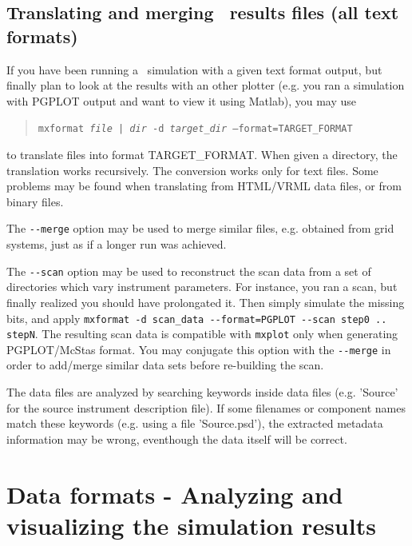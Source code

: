\subsection{Translating and merging \MCX\ results files (all text formats)}
\label{s:mxformat}
    

If you have been running a \MCX\ simulation with a given text format output, but finally plan to look at the results with an other plotter (e.g. you ran a simulation with PGPLOT output and want to view it using Matlab), you may use
\begin{quote}
  \texttt{mxformat \textit{file | dir} -d \textit{target\_dir} --format=TARGET\_FORMAT}
\end{quote}
to translate files into format TARGET\_FORMAT. When given a directory, the translation works recursively. The conversion works only for text files. Some problems may be found when translating from HTML/VRML data files, or from binary files.

The \verb+--merge+ option may be used to merge similar files, e.g. obtained from grid systems, just as if a longer run was achieved.

The \verb+--scan+ option may be used to reconstruct the scan data from a set of directories which vary instrument parameters. For instance, you ran a scan, but finally realized you should have prolongated it. Then simply simulate the missing bits, and apply \verb+mxformat -d scan_data --format=PGPLOT --scan step0 .. stepN+. The resulting scan data is compatible with \verb+mxplot+ only when generating PGPLOT/McStas format. You may conjugate this option with the \verb+--merge+ in order to add/merge similar data sets before re-building the scan.

The data files are analyzed by searching keywords inside data files (e.g. 'Source' for the source instrument description file). If some filenames or component names match these keywords (e.g. using a file 'Source.psd'), the extracted metadata information may be wrong, eventhough the data itself will be correct.

\section{Data formats - Analyzing and visualizing the simulation results}
\label{s:analyze}

